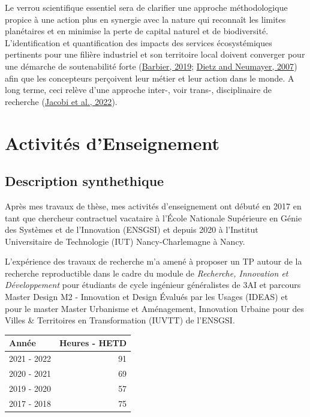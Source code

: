 \documentclass[
  11pt,
]{article}
\begin{document}
Le verrou scientifique essentiel sera de clarifier une approche
méthodologique propice à une action plus en synergie avec la nature qui
reconnaît les limites planétaires et en minimise la perte de capital
naturel et de biodiversité. L'identification et quantification des
impacts des services écosystémiques pertinents pour une filière
industriel et son territoire local doivent converger pour une démarche
de soutenabilité forte (\protect\hyperlink{ref-Barbier2019}{Barbier,
2019}; \protect\hyperlink{ref-Dietz2006}{Dietz and Neumayer, 2007}) afin
que les concepteurs perçoivent leur métier et leur action dans le monde.
A long terme, ceci relève d'une approche inter-, voir trans-,
disciplinaire de recherche (\protect\hyperlink{ref-Jacobi2022}{Jacobi et
al., 2022}).

\newpage

\hypertarget{activituxe9s-denseignement}{%
\section{Activités d'Enseignement}\label{activituxe9s-denseignement}}

\hypertarget{description-synthethique}{%
\subsection{Description synthethique}\label{description-synthethique}}

Après mes travaux de thèse, mes activités d'enseignement ont débuté en
2017 en tant que chercheur contractuel vacataire à l'École Nationale
Supérieure en Génie des Systèmes et de l'Innovation (ENSGSI) et depuis
2020 à l'Institut Universitaire de Technologie (IUT) Nancy-Charlemagne à
Nancy.

L'expérience des travaux de recherche m'a amené à proposer un TP autour
de la recherche reproductible dans le cadre du module de
\emph{Recherche, Innovation et Développement} pour étudiants de cycle
ingénieur généralistes de 3AI et parcours Master Design M2 - Innovation
et Design Évalués par les Usages (IDEAS) et pour le master Master
Urbanisme et Aménagement, Innovation Urbaine pour des Villes \&
Territoires en Transformation (IUVTT) de l'ENSGSI.

\begin{table}
\centering
\begin{tabular}[t]{lr}
\toprule
Année & Heures - HETD\\
\midrule
2021 - 2022 & 91\\
2020 - 2021 & 69\\
2019 - 2020 & 57\\
2017 - 2018 & 75\\
\bottomrule
\end{tabular}
\end{table}
\end{document}
